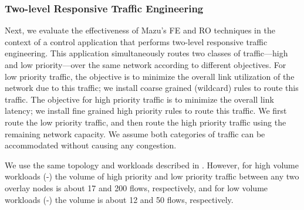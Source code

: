 \subsubsection{Two-level Responsive Traffic Engineering} 
Next, we evaluate the effectiveness of Mazu's FE and RO techniques in the
context of a control application that performs two-level responsive traffic
engineering. This application simultaneously routes two classes of
traffic---high and low priority---over the same network according to
different objectives. For low priority traffic, the objective is to minimize
the overall link utilization of the network due to this traffic; we install
coarse grained (wildcard) rules to route this traffic.  The objective for
high priority traffic is to minimize the overall link latency; we install
fine grained high priority rules to route this traffic. We first route the
low priority traffic, and then route the high priority traffic using the
remaining network capacity. We assume both categories of traffic can be
accommodated without causing any congestion. 

We use the same topology and workloads described in .
However, for high volume workloads (\sD-\sF) the volume of high priority and
low priority traffic between any two overlay nodes is about 17 and 200 flows,
respectively, and for low volume workloads (\sA-\sC) the volume is about 12
and 50 flows, respectively.




